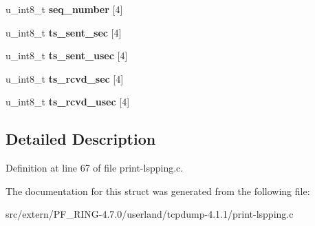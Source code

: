 \begin{DoxyCompactItemize}
\item 
\hypertarget{structlspping__common__header_a7a81404879412d367da6b85e8969ae21}{
u\_\-int8\_\-t {\bfseries seq\_\-number} \mbox{[}4\mbox{]}}
\label{structlspping__common__header_a7a81404879412d367da6b85e8969ae21}

\item 
\hypertarget{structlspping__common__header_ad0b30c385ce53cd4d6b420c71b1022ea}{
u\_\-int8\_\-t {\bfseries ts\_\-sent\_\-sec} \mbox{[}4\mbox{]}}
\label{structlspping__common__header_ad0b30c385ce53cd4d6b420c71b1022ea}

\item 
\hypertarget{structlspping__common__header_ae64bd14825a1d7c2aeed49831ad55a5f}{
u\_\-int8\_\-t {\bfseries ts\_\-sent\_\-usec} \mbox{[}4\mbox{]}}
\label{structlspping__common__header_ae64bd14825a1d7c2aeed49831ad55a5f}

\item 
\hypertarget{structlspping__common__header_a1dfa2839af1a8437537aeaa91d2c37da}{
u\_\-int8\_\-t {\bfseries ts\_\-rcvd\_\-sec} \mbox{[}4\mbox{]}}
\label{structlspping__common__header_a1dfa2839af1a8437537aeaa91d2c37da}

\item 
\hypertarget{structlspping__common__header_a58c3ca1edad8f7b27a8381055f713bfb}{
u\_\-int8\_\-t {\bfseries ts\_\-rcvd\_\-usec} \mbox{[}4\mbox{]}}
\label{structlspping__common__header_a58c3ca1edad8f7b27a8381055f713bfb}

\end{DoxyCompactItemize}


\subsection{Detailed Description}


Definition at line 67 of file print-\/lspping.c.



The documentation for this struct was generated from the following file:\begin{DoxyCompactItemize}
\item 
src/extern/PF\_\-RING-\/4.7.0/userland/tcpdump-\/4.1.1/print-\/lspping.c\end{DoxyCompactItemize}
